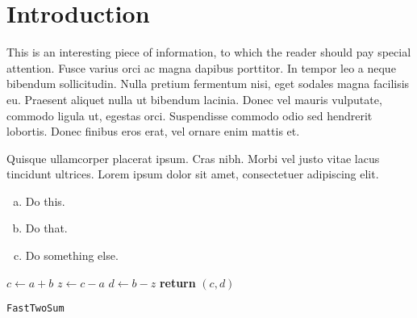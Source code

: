 \documentclass{article}
\begin{document}
\section*{Introduction} %

\begin{info} %
	This is an interesting piece of information, to which the reader should pay special attention. Fusce varius orci ac magna dapibus porttitor. In tempor leo a neque bibendum sollicitudin. Nulla pretium fermentum nisi, eget sodales magna facilisis eu. Praesent aliquet nulla ut bibendum lacinia. Donec vel mauris vulputate, commodo ligula ut, egestas orci. Suspendisse commodo odio sed hendrerit lobortis. Donec finibus eros erat, vel ornare enim mattis et.
\end{info}

\begin{question}
	Quisque ullamcorper placerat ipsum. Cras nibh. Morbi vel justo vitae lacus tincidunt ultrices. Lorem ipsum dolor sit amet, consectetuer adipiscing elit.

	\begin{enumerate}[(a)]
		\item Do this.
		\item Do that.
		\item Do something else.
	\end{enumerate}
\end{question}
	


\begin{center}
	\begin{minipage}{0.5\linewidth} %
		\begin{algorithm}[H]
			\medskip
			$c \leftarrow a + b$ \;
			$z \leftarrow c - a$ \;
			$d \leftarrow b - z$ \;
			{\bf return} $(c,d)$ \;
			\caption{\texttt{FastTwoSum}} %
			\label{alg:fastTwoSum}   %
		\end{algorithm}
	\end{minipage}
\end{center}
\end{document}

